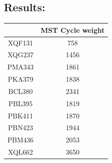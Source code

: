 \documentclass{article}
\begin{document}
\subsection*{Results:}
\begin{center}
    \begin{tabular}{| c | c |}
        \hline
        & MST Cycle weight\\ 
        \hline
        XQF131 & 758\\
        \hline
        XQG237 & 1456\\
        \hline
        PMA343 & 1861\\
        \hline
        PKA379 & 1838\\
        \hline
        BCL380 & 2341\\
        \hline
        PBL395 & 1819\\
        \hline
        PBK411 & 1870\\
        \hline
        PBN423 & 1944\\
        \hline
        PBM436 & 2053\\
        \hline
        XQL662 & 3650\\
        \hline
    \end{tabular}
    \end{center}
\end{document}
